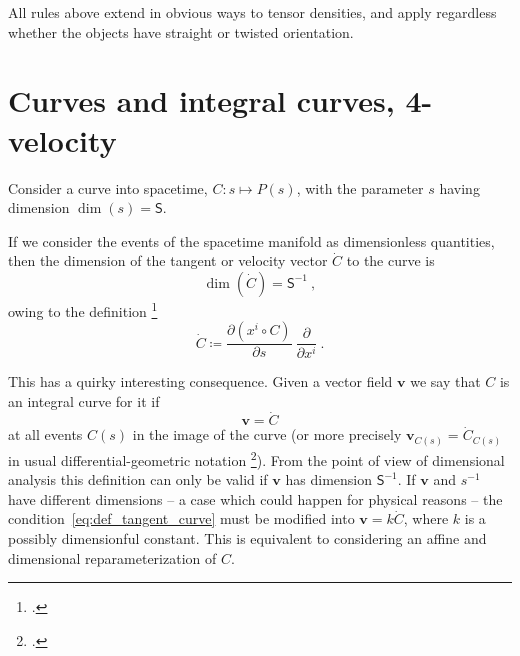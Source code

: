 \documentclass[\ifafour a4paper,12pt,\else a5paper,10pt,\fi%
onecolumn,oneside,article,%
british%
]{memoir}
\newcommand*{\defquote}[1]{`#1'}
\theoremstyle{remark}
\theoremstyle{innote}
\newcommand*{\citep}{\footcites}
\newcommand*{\de}{\partialup}%
\newcommand*{\defd}{\coloneqq}
\renewcommand*{\|}[1][]{\nonscript\,#1\vert\nonscript\;\mathopen{}}
\newcommand*{\sect}{\S}%
\newcommand*{\chap}{ch.}%
\newcommand*{\Ss}{\textsf{S}}
\newcommand*{\yv}{\bm{v}}
\newcommand*{\dex}[1][i]{\frac{\de}{\de x^{#1}}}
\begin{document}
\medskip


All rules above extend in obvious ways to tensor densities, and apply
regardless whether the objects have straight or twisted orientation.



\section{Curves and integral curves, 4-velocity}
\label{sec:curves}


Consider a curve into spacetime, $C\colon s \mapsto P(s)$, with the
parameter $s$ having dimension $\dim(s)=\Ss$.


If we consider the events of the spacetime manifold as dimensionless
quantities, then the dimension of the tangent or velocity vector $\dot{C}$
to the curve is
\begin{equation}
  \label{eq:dim_velocity}
  \dim(\dot{C}) = \Ss^{-1} \ ,
\end{equation}
owing to the definition
\citep[\sect~III.B.1]{choquetbruhatetal1977_r1996}[\sect~IV.(1.9)]{boothby1975_r2003}
\begin{equation}
  \label{eq:def_tangent_curve}
\dot{C} \defd \frac{\de (x^{i} \circ C)}{\de s}\ \dex \ .
\end{equation}

This has a quirky  interesting consequence. Given a vector field $\yv$
we say that $C$ is an integral curve for it if
\begin{equation}
  \yv = \dot{C}
  \label{eq:integral_curve}
\end{equation}
at all events $C(s)$ in the image of the curve (or more precisely
$\yv_{C(s)} = \dot{C}_{C(s)}$ in usual differential-geometric notation
\citep[\sect~III.B.1]{choquetbruhatetal1977_r1996}). From the point of view
of dimensional analysis this definition can only be valid if $\yv$ has
dimension $\Ss^{-1}$. If $\yv$ and $s^{-1}$ have different dimensions -- a
case which could happen for physical reasons -- the
condition~\eqref{eq:def_tangent_curve} must be modified into
$\yv = k\dot{C}$, where $k$ is a possibly dimensionful constant. This is
equivalent to considering an affine and dimensional reparameterization of
$C$.
\end{document}
